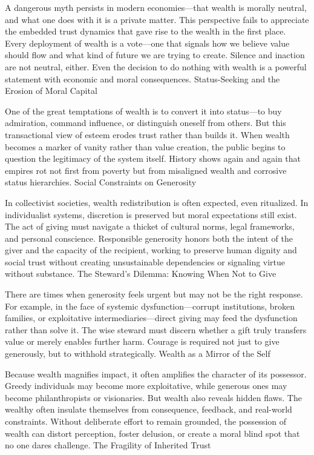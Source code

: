 \documentclass[11pt,oneside]{book}
\begin{document}
A dangerous myth persists in modern economies—that wealth is morally neutral, and what one does with it is a private matter. This perspective fails to appreciate the embedded trust dynamics that gave rise to the wealth in the first place. Every deployment of wealth is a vote—one that signals how we believe value should flow and what kind of future we are trying to create. Silence and inaction are not neutral, either. Even the decision to do nothing with wealth is a powerful statement with economic and moral consequences.
Status-Seeking and the Erosion of Moral Capital

One of the great temptations of wealth is to convert it into status—to buy admiration, command influence, or distinguish oneself from others. But this transactional view of esteem erodes trust rather than builds it. When wealth becomes a marker of vanity rather than value creation, the public begins to question the legitimacy of the system itself. History shows again and again that empires rot not first from poverty but from misaligned wealth and corrosive status hierarchies.
Social Constraints on Generosity

In collectivist societies, wealth redistribution is often expected, even ritualized. In individualist systems, discretion is preserved but moral expectations still exist. The act of giving must navigate a thicket of cultural norms, legal frameworks, and personal conscience. Responsible generosity honors both the intent of the giver and the capacity of the recipient, working to preserve human dignity and social trust without creating unsustainable dependencies or signaling virtue without substance.
The Steward’s Dilemma: Knowing When Not to Give

There are times when generosity feels urgent but may not be the right response. For example, in the face of systemic dysfunction—corrupt institutions, broken families, or exploitative intermediaries—direct giving may feed the dysfunction rather than solve it. The wise steward must discern whether a gift truly transfers value or merely enables further harm. Courage is required not just to give generously, but to withhold strategically.
Wealth as a Mirror of the Self

Because wealth magnifies impact, it often amplifies the character of its possessor. Greedy individuals may become more exploitative, while generous ones may become philanthropists or visionaries. But wealth also reveals hidden flaws. The wealthy often insulate themselves from consequence, feedback, and real-world constraints. Without deliberate effort to remain grounded, the possession of wealth can distort perception, foster delusion, or create a moral blind spot that no one dares challenge.
The Fragility of Inherited Trust
\end{document}
